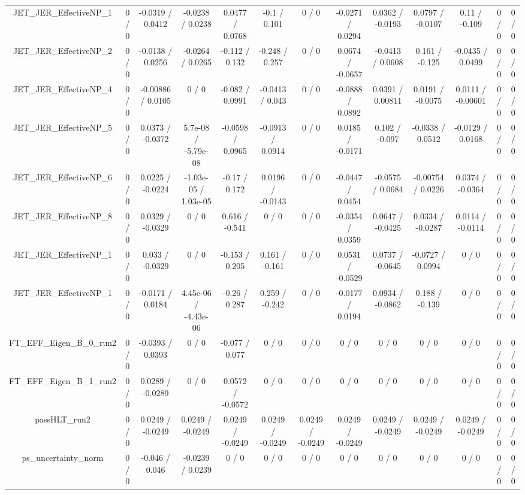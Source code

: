 \documentclass[10pt]{article}
\begin{document}
\begin{table}[htbp]
\begin{center}
\begin{tabular}{|c|c|c|c|c|c|c|c|c|c|c|c|c|}
  JET_JER_EffectiveNP_1 & 0 / 0 & -0.0319 / 0.0412 & -0.0238 / 0.0238 & 0.0477 / 0.0768 & -0.1 / 0.101 & 0 / 0 & -0.0271 / 0.0294 & 0.0362 / -0.0193 & 0.0797 / -0.0107 & 0.11 / -0.109 & 0 / 0 & 0 / 0 \\ 
  JET_JER_EffectiveNP_2 & 0 / 0 & -0.0138 / 0.0256 & -0.0264 / 0.0265 & -0.112 / 0.132 & -0.248 / 0.257 & 0 / 0 & 0.0674 / -0.0657 & -0.0413 / 0.0608 & 0.161 / -0.125 & -0.0435 / 0.0499 & 0 / 0 & 0 / 0 \\ 
  JET_JER_EffectiveNP_4 & 0 / 0 & -0.00886 / 0.0105 & 0 / 0 & -0.082 / 0.0991 & -0.0413 / 0.043 & 0 / 0 & -0.0888 / 0.0892 & 0.0391 / 0.00811 & 0.0191 / -0.0075 & 0.0111 / -0.00601 & 0 / 0 & 0 / 0 \\ 
  JET_JER_EffectiveNP_5 & 0 / 0 & 0.0373 / -0.0372 & 5.7e-08 / -5.79e-08 & -0.0598 / 0.0965 & -0.0913 / 0.0914 & 0 / 0 & 0.0185 / -0.0171 & 0.102 / -0.097 & -0.0338 / 0.0512 & -0.0129 / 0.0168 & 0 / 0 & 0 / 0 \\ 
  JET_JER_EffectiveNP_6 & 0 / 0 & 0.0225 / -0.0224 & -1.03e-05 / 1.03e-05 & -0.17 / 0.172 & 0.0196 / -0.0143 & 0 / 0 & -0.0447 / 0.0454 & -0.0575 / 0.0684 & -0.00754 / 0.0226 & 0.0374 / -0.0364 & 0 / 0 & 0 / 0 \\ 
  JET_JER_EffectiveNP_8 & 0 / 0 & 0.0329 / -0.0329 & 0 / 0 & 0.616 / -0.541 & 0 / 0 & 0 / 0 & -0.0354 / 0.0359 & 0.0647 / -0.0425 & 0.0334 / -0.0287 & 0.0114 / -0.0114 & 0 / 0 & 0 / 0 \\ 
  JET_JER_EffectiveNP_1 & 0 / 0 & 0.033 / -0.0329 & 0 / 0 & -0.153 / 0.205 & 0.161 / -0.161 & 0 / 0 & 0.0531 / -0.0529 & 0.0737 / -0.0645 & -0.0727 / 0.0994 & 0 / 0 & 0 / 0 & 0 / 0 \\ 
  JET_JER_EffectiveNP_1 & 0 / 0 & -0.0171 / 0.0184 & 4.45e-06 / -4.43e-06 & -0.26 / 0.287 & 0.259 / -0.242 & 0 / 0 & -0.0177 / 0.0194 & 0.0934 / -0.0862 & 0.188 / -0.139 & 0 / 0 & 0 / 0 & 0 / 0 \\ 
  FT_EFF_Eigen_B_0_run2 & 0 / 0 & -0.0393 / 0.0393 & 0 / 0 & -0.077 / 0.077 & 0 / 0 & 0 / 0 & 0 / 0 & 0 / 0 & 0 / 0 & 0 / 0 & 0 / 0 & 0 / 0 \\ 
  FT_EFF_Eigen_B_1_run2 & 0 / 0 & 0.0289 / -0.0289 & 0 / 0 & 0.0572 / -0.0572 & 0 / 0 & 0 / 0 & 0 / 0 & 0 / 0 & 0 / 0 & 0 / 0 & 0 / 0 & 0 / 0 \\ 
  passHLT_run2 & 0 / 0 & 0.0249 / -0.0249 & 0.0249 / -0.0249 & 0.0249 / -0.0249 & 0.0249 / -0.0249 & 0.0249 / -0.0249 & 0.0249 / -0.0249 & 0.0249 / -0.0249 & 0.0249 / -0.0249 & 0.0249 / -0.0249 & 0 / 0 & 0 / 0 \\ 
  ps_uncertainty_norm & 0 / 0 & -0.046 / 0.046 & -0.0239 / 0.0239 & 0 / 0 & 0 / 0 & 0 / 0 & 0 / 0 & 0 / 0 & 0 / 0 & 0 / 0 & 0 / 0 & 0 / 0 \\ 

\end{tabular}
\end{center}
\end{table}
\end{document}

